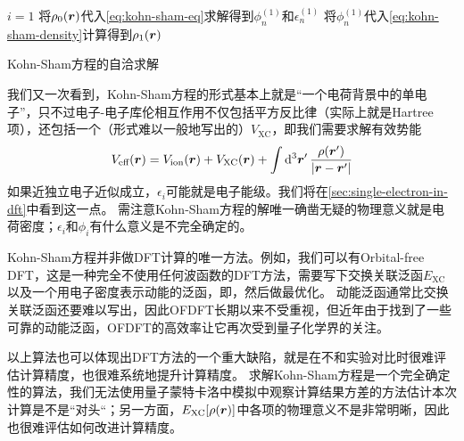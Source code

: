 \begin{algorithm}

    \DontPrintSemicolon
    \SetAlgoLined

    
    $i = 1$ \;
    将$\rho_0(\vb*{r})$代入\eqref{eq:kohn-sham-eq}求解得到$\phi_n^{(1)}$和$\epsilon_n^{(1)}$ \;
    将$\phi_n^{(1)}$代入\eqref{eq:kohn-sham-density}计算得到$\rho_1(\vb*{r})$ \;
    
    \;

    \caption{Kohn-Sham方程的自洽求解}
    \label{alg:basic-kohn-sham}
\end{algorithm}

我们又一次看到，Kohn-Sham方程的形式基本上就是“一个电荷背景中的单电子”，只不过电子-电子库伦相互作用不仅包括平方反比律（实际上就是Hartree项），还包括一个（形式难以一般地写出的）$V_\text{XC}$，即我们需要求解有效势能
\begin{equation}
    V_\text{eff}(\vb*{r}) = V_\text{ion}(\vb*{r}) + V_\text{XC}(\vb*{r}) + \int \dd[3]{\vb*{r}'} \frac{\rho(\vb*{r}')}{\abs{\vb*{r} - \vb*{r}'}}
\end{equation}
如果近独立电子近似成立，$\epsilon_i$可能就是电子能级。我们将在\autoref{sec:single-electron-in-dft}中看到这一点。
需注意Kohn-Sham方程的解唯一确凿无疑的物理意义就是电荷密度；$\epsilon_i$和$\phi_i$有什么意义是不完全确定的。

Kohn-Sham方程并非做DFT计算的唯一方法。例如，我们可以有Orbital-free DFT，这是一种完全不使用任何波函数的DFT方法，需要写下交换关联泛函$E_\text{XC}$以及一个用电子密度表示动能的泛函，即，然后做最优化。
动能泛函通常比交换关联泛函还要难以写出，因此OFDFT长期以来不受重视，但近年由于找到了一些可靠的动能泛函，OFDFT的高效率让它再次受到量子化学界的关注。

以上算法也可以体现出DFT方法的一个重大缺陷，就是在不和实验对比时很难评估计算精度，也很难系统地提升计算精度。
求解Kohn-Sham方程是一个完全确定性的算法，我们无法使用量子蒙特卡洛中模拟中观察计算结果方差的方法估计本次计算是不是“对头“；另一方面，$E_\text{XC}[\rho(\vb*{r})]$中各项的物理意义不是非常明晰，因此也很难评估如何改进计算精度。

